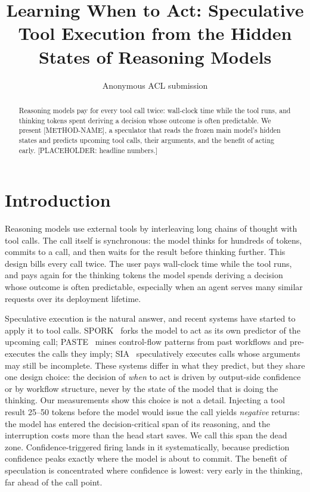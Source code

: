 \documentclass[11pt]{article}
\title{Learning When to Act: Speculative Tool Execution from the Hidden States of Reasoning Models}
\author{Anonymous ACL submission}
\begin{document}
\maketitle

\begin{abstract}
Reasoning models pay for every tool call twice: wall-clock time while the tool
runs, and thinking tokens spent deriving a decision whose outcome is often
predictable. We present [METHOD-NAME], a speculator that reads the frozen main
model's hidden states and predicts upcoming tool calls, their arguments, and
the benefit of acting early. [PLACEHOLDER: headline numbers.]
\end{abstract}

\section{Introduction}

Reasoning models use external tools by interleaving long chains of thought
with tool calls. The call itself is synchronous: the model thinks for hundreds
of tokens, commits to a call, and then waits for the result before thinking
further. This design bills every call twice. The user pays wall-clock time
while the tool runs, and pays again for the thinking tokens the model spends
deriving a decision whose outcome is often predictable, especially when an
agent serves many similar requests over its deployment lifetime.

Speculative execution is the natural answer, and recent systems have started
to apply it to tool calls. SPORK~\citep{spork2026} forks the model to act as
its own predictor of the upcoming call; PASTE~\citep{paste2026} mines
control-flow patterns from past workflows and pre-executes the calls they
imply; SIA~\citep{sia2026} speculatively executes calls whose arguments may
still be incomplete. These systems differ in what they predict, but they share
one design choice: the decision of \emph{when} to act is driven by output-side
confidence or by workflow structure, never by the state of the model that is
doing the thinking. Our measurements show this choice is not a detail.
Injecting a tool result 25--50 tokens before the model would issue the call
yields \emph{negative} returns: the model has entered the decision-critical
span of its reasoning, and the interruption costs more than the head start
saves.
We call this span the dead zone. Confidence-triggered firing lands in it
systematically, because prediction confidence peaks exactly where the model is
about to commit.
The benefit of speculation is concentrated where confidence is lowest: very
early in the thinking, far ahead of the call point.
\end{document}
